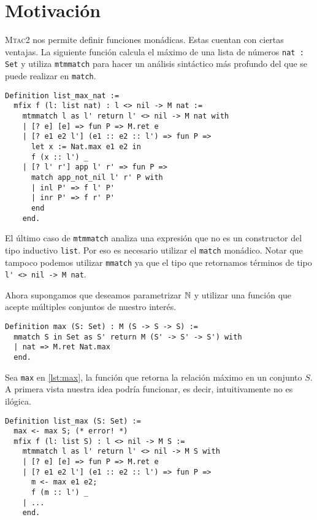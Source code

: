 \chapter{Motivación}\label{ch:motivacion}

\textsc{Mtac2} nos permite definir funciones monádicas. Estas cuentan con ciertas ventajas.
La siguiente función calcula el máximo de una lista de números \lstinline{nat : Set} y utiliza \lstinline{mtmmatch} para hacer un análisis sintáctico más profundo del que se puede realizar en \lstinline{match}. %

\begin{lstlisting}[frame=tb,caption={Función \lstinline{list_max_nat}},label=lst:list_max_nat]
Definition list_max_nat :=
  mfix f (l: list nat) : l <> nil -> M nat :=
    mtmmatch l as l' return l' <> nil -> M nat with
    | [? e] [e] => fun P => M.ret e
    | [? e1 e2 l'] (e1 :: e2 :: l') => fun P =>
      let x := Nat.max e1 e2 in
      f (x :: l') _
    | [? l' r'] app l' r' => fun P =>
      match app_not_nil l' r' P with
      | inl P' => f l' P'
      | inr P' => f r' P'
      end
    end.
\end{lstlisting}

El último caso de \lstinline{mtmmatch} analiza una expresión que no es un constructor del tipo inductivo \lstinline{list}. Por eso es necesario utilizar el \lstinline{match} monádico.
Notar que tampoco podemos utilizar \lstinline{mmatch} ya que el tipo que retornamos términos de tipo \lstinline{l' <> nil -> M nat}.

Ahora supongamos que deseamos parametrizar $\mathbb{N}$ y utilizar una función que acepte múltiples conjuntos de nuestro interés.

\begin{lstlisting}[frame=tb,caption={Función \lstinline{max}},label=lst:max]
Definition max (S: Set) : M (S -> S -> S) :=
  mmatch S in Set as S' return M (S' -> S' -> S') with
  | nat => M.ret Nat.max
  end.
\end{lstlisting}

Sea \lstinline{max} en \ref{lst:max}, la función que retorna la relación máximo en un conjunto $S$.
A primera vista nuestra idea podría funcionar, es decir, intuitivamente no es ilógica.

\begin{lstlisting}[frame=tb,caption={Función \lstinline{list_max}},label=lst:list_max]
Definition list_max (S: Set) :=
  max <- max S; (* error! *)
  mfix f (l: list S) : l <> nil -> M S :=
    mtmmatch l as l' return l' <> nil -> M S with
    | [? e] [e] => fun P => M.ret e
    | [? e1 e2 l'] (e1 :: e2 :: l') => fun P =>
      m <- max e1 e2;
      f (m :: l') _
    | ...
    end.
\end{lstlisting}


